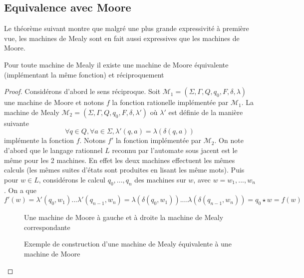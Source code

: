 \documentclass{scrartcl}
\begin{document}
\begin{flushleft}

\subsection{Equivalence avec Moore}

Le théorème suivant montre que malgré une plus grande expressivité à première vue, les machines de Mealy sont en fait aussi expressives que les machines
de Moore.

\begin{theorem}
    Pour toute machine de Mealy il existe une machine de Moore équivalente (implémentant la même fonction) et réciproquement
\end{theorem}

\begin{proof}
    Considérons d'abord le sens réciproque. Soit $\mathcal{M}_1 = (\Sigma, \Gamma, Q, q_0, F, \delta, \lambda)$ une machine de Moore et notons $f$ la
    fonction rationelle implémentée par $\mathcal{M}_1$. La machine de Mealy $\mathcal{M}_2 = (\Sigma, \Gamma, Q, q_0, F, \delta, \lambda')$ où
    $\lambda'$ est définie de la manière suivante
    \[ \forall q \in Q, \forall a \in \Sigma, \lambda'(q, a) = \lambda(\delta(q, a)) \]
    implémente la fonction $f$. Notons $f'$ la fonction implémentée par $\mathcal{M}_2$. On note d'abord que le langage rationnel $L$ reconnu par l'automate
    sous jacent est le même pour les 2 machines. En effet les deux machines effectuent les mêmes calculs (les mêmes suites d'états sont produites
    en lisant les même mots). Puis pour $w \in L$, considérons le calcul $q_0, ..., q_n$ des machines sur $w$, avec $w = w_1, ..., w_n$. On a que
    \[ f'(w) = \lambda'(q_0, w_1) ... \lambda'(q_{n-1}, w_n) = \lambda(\delta(q_0, w_1)) .... \lambda(\delta(q_{n-1}, w_n)) = q_0 \star w = f(w) \]
    \begin{figure}[h]
        \caption{Exemple de construction d'une machine de Mealy équivalente à une machine de Moore}
        \begin{center}
        Une machine de Moore à gauche et à droite la machine de Mealy correspondante
\end{center}
\end{figure}
\end{proof}
\end{flushleft}
\end{document}
